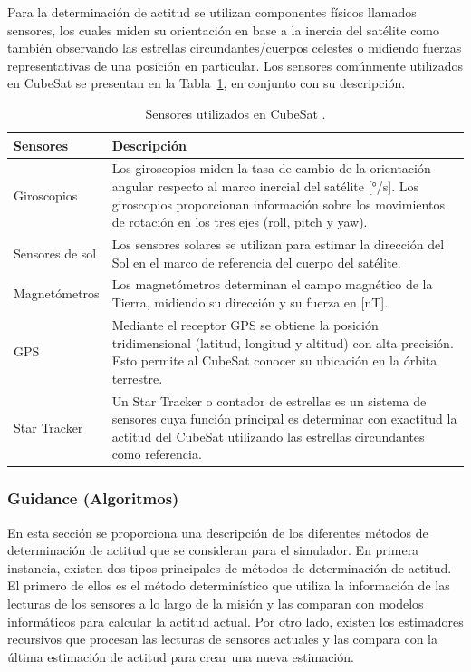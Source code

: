 Para la determinación de actitud se utilizan componentes físicos llamados sensores, los cuales miden su orientación en base a la inercia del satélite como también observando las estrellas circundantes/cuerpos celestes o midiendo fuerzas representativas de una posición en particular. Los sensores comúnmente utilizados en CubeSat se presentan en la Tabla~\ref{tab:sensores}, en conjunto con su descripción.


\begin{table}[h!]
	\centering
	\caption{Sensores utilizados en CubeSat \cite{ref6}.}
	\begin{tabular}{|l|p{10cm}|}
		\hline
		\textbf{Sensores} & \textbf{Descripción} \\ \hline
		Giroscopios & Los giroscopios miden la tasa de cambio de la orientación angular respecto al marco inercial del satélite [°/s]. Los giroscopios proporcionan información sobre los movimientos de rotación en los tres ejes (roll, pitch y yaw). \\ \hline
		Sensores de sol & Los sensores solares se utilizan para estimar la dirección del Sol en el marco de referencia del cuerpo del satélite. \\ \hline
		Magnetómetros & Los magnetómetros determinan el campo magnético de la Tierra, midiendo su dirección y su fuerza en [nT]. \\ \hline
		GPS & Mediante el receptor GPS se obtiene la posición tridimensional (latitud, longitud y altitud) con alta precisión. Esto permite al CubeSat conocer su ubicación en la órbita terrestre. \\ \hline
		Star Tracker & Un Star Tracker o contador de estrellas es un sistema de sensores cuya función principal es determinar con exactitud la actitud del CubeSat utilizando las estrellas circundantes como referencia. \\ \hline
	\end{tabular}
	\label{tab:sensores}
\end{table}

\subsubsection{Guidance (Algoritmos) \cite{ref15}}

En esta sección se proporciona una descripción de los diferentes métodos de determinación de actitud que se consideran para el simulador. En primera instancia, existen dos tipos principales de métodos de determinación de actitud. El primero de ellos es el método determinístico que utiliza la información de las lecturas de los sensores a lo largo de la misión y las comparan con modelos informáticos para calcular la actitud actual. Por otro lado, existen los estimadores recursivos que procesan las lecturas de sensores actuales y las compara con la última estimación de actitud para crear una nueva estimación.


